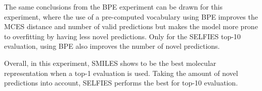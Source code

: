The same conclusions from the \ac{BPE} experiment can be drawn for this experiment, where the use of a pre-computed vocabulary using \ac{BPE} improves the MCES distance and number of valid predictions but makes the model more prone to overfitting by having less novel predictions.
Only for the SELFIES top-10 evaluation, using \ac{BPE} also improves the number of novel predictions.

Overall, in this experiment, SMILES shows to be the best molecular representation when a top-1 evaluation is used.
Taking the amount of novel predictions into account, SELFIES performs the best for top-10 evaluation.
